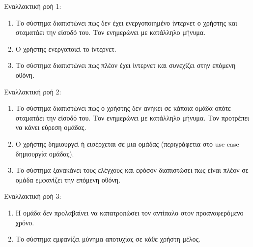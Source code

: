 Εναλλακτική ροή 1:
\begin{enumerate}[label=2.\alph*.,ref=2.\alph*]
\item Το σύστημα διαπιστώνει πως δεν έχει ενεργοποιημένο ίντερνετ ο χρήστης και σταματάει την είσοδό του. Τον ενημερώνει με κατάλληλο μήνυμα.
\item Ο χρήστης ενεργοποιεί το ίντερνετ.
\item Το σύστημα διαπιστώνει πως πλέον έχει ίντερνετ και συνεχίζει στην επόμενη οθόνη.
\end{enumerate}

Εναλλακτική ροή 2:
\begin{enumerate}[label=2.\alph*.,ref=2.\alph*]
\item Το σύστημα διαπιστώνει πως ο χρήστης δεν ανήκει σε κάποια ομάδα οπότε σταματάει την είσοδό του. Τον ενημερώνει με κατάλληλο μήνυμα. Τον προτρέπει να κάνει εύρεση ομάδας.
\item Ο χρήστης δημιουργεί ή εισέρχεται σε μια ομάδας (περιγράφετια στο use case δημιουργία ομάδας).
\item Το σύστημα ξανακάνει τους ελέγχους και εφόσον διαπιστώσει πως είναι πλέον σε ομάδα εμφανίζει την επόμενη οθόνη.
\end{enumerate}

Εναλλακτική ροή 3:
\begin{enumerate}[label=2.\alph*.,ref=2.\alph*]
\item Η ομάδα δεν προλαβαίνει να κατατροπώσει τον αντίπαλο στον προαναφερόμενο χρόνο.
\item Το σύστημα εμφανίζει μύνημα αποτυχίας σε κάθε χρήστη μέλος.
\end{enumerate}

\newpage
